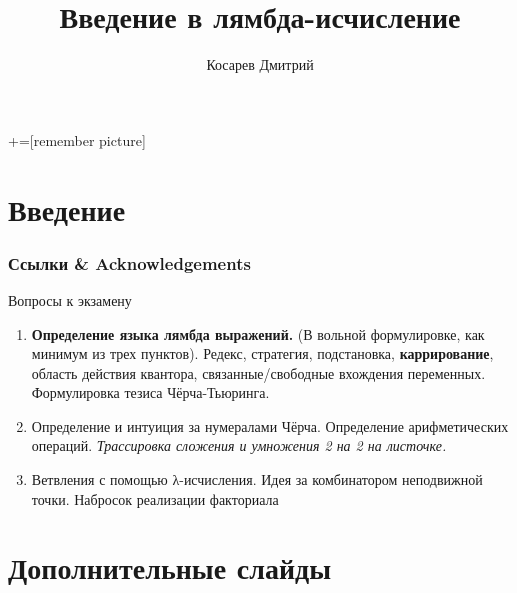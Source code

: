 \documentclass[aspectratio=169
  , xcolor={svgnames}
  , hyperref={colorlinks,citecolor=DeepPink4,linkcolor=DarkRed,urlcolor=DarkBlue}
  , russian  %
  ]{beamer}
\title[Введение в лямбда-исчисление]{Введение в лямбда-исчисление}
\author{Косарев Дмитрий}
\date{\DTMDate{2025-03-12}}
\begin{document}
\maketitle

+=[remember picture]

\everymath{\displaystyle}





\section*{Введение}


\begin{frame}%
\frametitle<presentation>{Ссылки \& Acknowledgements}
\vspace{-1.5em}
\printbibliography
\end{frame}


\begin{frame}{Вопросы к экзамену  }
\begin{enumerate}
	\item \textbf{Определение языка лямбда выражений.} (В вольной формулировке, как минимум из трех пунктов). Редекс, стратегия, подстановка, \textbf{каррирование}, область действия квантора, связанные/свободные вхождения переменных. Формулировка тезиса Чёрча-Тьюринга.
	\item Определение и интуиция за нумералами Чёрча. Определение арифметических операций. \textit{Трассировка сложения и умножения 2 на 2 на листочке.}
	\item Ветвления с помощью λ-исчисления. Идея за комбинатором неподвижной точки. Набросок реализации факториала

\end{enumerate}
\end{frame}

\appendix

\section{Дополнительные слайды}




\end{document}
